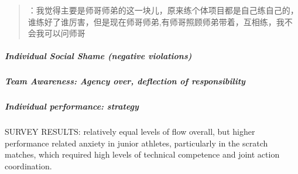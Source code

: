           \begin{CJK}{UTF8}{gbsn}
            \begin{quotation}
              ：我觉得主要是师哥师弟的这一块儿，原来练个体项目都是自己练自己的，谁练好了谁厉害，但是现在师哥师弟,有师哥照顾师弟带着，互相练，我不会我可以问师哥
            \end{quotation}
          \end{CJK}






          \subparagraph{Individual Social Shame (negative violations)}








            \subparagraph{Team Awareness: Agency over, deflection of responsibility}

          \subparagraph{Individual performance: strategy}








        SURVEY RESULTS: relatively equal levels of flow overall, but higher performance related anxiety in junior athletes, particularly in the scratch matches, which required high levels of technical competence and joint action coordination.


